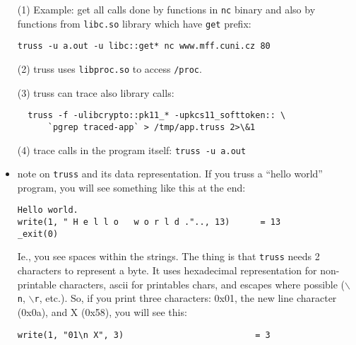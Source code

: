 \begin{itemize}
  \item[(1)] Example: get all calls done by functions in \texttt{nc} binary
  and also by functions from \texttt{libc.so} library which have
  \texttt{get} prefix:
\begin{verbatim}
truss -u a.out -u libc::get* nc www.mff.cuni.cz 80
\end{verbatim}
  \item[(2)] truss uses \texttt{libproc.so} to access \texttt{/proc}.
  \item[(3)] truss can trace also library calls:
\begin{verbatim}
  truss -f -ulibcrypto::pk11_* -upkcs11_softtoken:: \
      `pgrep traced-app` > /tmp/app.truss 2>\&1
\end{verbatim}
  \item[(4)] trace calls in the program itself: \texttt{truss -u a.out}
  \item note on \texttt{truss} and its data representation. If you truss a
  ``hello world'' program, you will see something like this at the end:

\begin{verbatim}
Hello world.
write(1, " H e l l o   w o r l d .".., 13)      = 13
_exit(0)
\end{verbatim}

  Ie., you see spaces within the strings. The thing is that \texttt{truss} needs
  2 characters to represent a byte. It uses hexadecimal representation for
  non-printable cha\-rac\-ters, ascii for printables chars, and escapes where
  possible ($\backslash$\texttt{n}, $\backslash$\texttt{r}, etc.). So, if you
  print three characters: 0x01, the new line character (0x0a), and X (0x58),
  you will see this:

\begin{verbatim}
write(1, "01\n X", 3)                          = 3
\end{verbatim}
\end{itemize}

~


